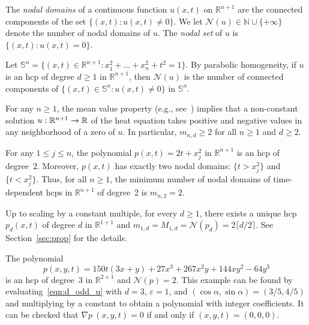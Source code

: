 \documentclass[AHL,Unicode,longabstracts,published]{cedram}
\newcommand{\N}{\mathbb{N}}
\newcommand{\R}{\mathbb{R}}
\newcommand{\sphere}{\mathbb{S}}
\newcommand{\nodal}{\mathcal{N}}
\renewcommand{\epsilon}{\varepsilon}
\renewcommand*{\to}{\mathchoice{\longrightarrow}{\rightarrow}{\rightarrow}{\rightarrow}}
\newcommand{\R}{\mathbb{R}}
\begin{document}
\begin{defi}
The \emph{nodal domains} of a continuous function $u(x,t)$ on $\R^{n+1}$ are the connected components of the set $\{(x,t) : u(x,t) \ne 0\}$. We let $\nodal(u) \in \N \cup \{+\infty\}$ denote the number of nodal domains of $u$. The \emph{nodal set} of $u$ is $\{(x,t):u(x,t)=0\}$.
\end{defi}

\begin{rema}\label{r:sphere}
Let $\sphere^n=\{(x,t)\in\R^{n+1}:x_1^2+\dots+x_n^2+t^2=1\}$. By parabolic homogeneity, if $u$ is an hcp of degree $d\geq 1$ in $\R^{n+1}$, then $\nodal(u)$ is the number of connected components of $\{(x,t)\in\sphere^n:u(x,t)\neq 0\}$ in $\sphere^n$.
\end{rema}

\begin{rema}\label{r:meanvalue}
For any $n\geq 1$, the mean value property (e.g., see~\cite[p.~50]{Evans-PDE}) implies that a non-constant solution $u:\R^{n+1}\to \R$ of the heat equation takes positive and negative values in any neighborhood of a zero of $u$. In particular, $m_{n,d}\geq 2$ for all $n\geq 1$ and $d\geq 2$.
\end{rema}

\begin{exam}\label{eq:deg_2}
For any $1\leq j\leq n$, the polynomial $p(x,t) = 2t + x_j^2$ in $\R^{n+1}$ is an hcp of degree~$2$. Moreover, $p(x,t)$ has exactly two nodal domains: $\{ t > x_j^2\}$ and $\{t < x_j^2 \}$. Thus, for all $n\geq 1$, the minimum number of nodal domains of time-dependent hcps in $\R^{n+1}$ of degree~2 is $m_{n,2}=2$.
\end{exam}

\begin{exam}\label{eq:1d}
Up to scaling by a constant multiple, for every $d\geq 1$, there exists a unique hcp $p_d(x,t)$ of degree $d$ in $\R^{1+1}$ and $m_{1,d}=M_{1,d}=\nodal(p_d)=2\lceil d/2\rceil$. See Section~\ref{sec:prop} for the details.
\end{exam}

\begin{exam}\label{eq:n2d3}
The polynomial
\begin{equation}
p(x,y,t)=150t(3x+y)+27x^3+267x^2y+144xy^2-64y^3
\end{equation}
is an hcp of degree~3 in $\R^{2+1}$ and $\nodal(p)=2$. This example can be found by evaluating~\eqref{eqn:d_odd_u} with $d=3$, $\epsilon=1$, and $(\cos\alpha,\sin\alpha)=(3/5,4/5)$ and multiplying by a constant to obtain a polynomial with integer coefficients. It can be checked that $\nabla p~(x,y,t)=0$ if and only if $(x,y,t)=(0,0,0)$.
\end{exam}
\end{document}
